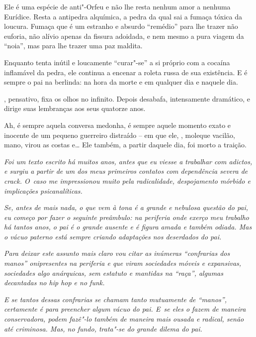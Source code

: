 Ele é uma espécie de anti"-Orfeu e não lhe resta nenhum amor a nenhuma
Eurídice. Resta a antipedra alquímica, a pedra da qual sai a fumaça
tóxica da loucura. Fumaça que é um estranho e absurdo ``remédio'' para
lhe trazer não euforia, não alívio apenas da fissura adoidada, e nem
mesmo a pura viagem da ``noia'', mas para lhe trazer uma paz maldita.

Enquanto  tenta inútil e loucamente ``curar"-se'' a si próprio com a
cocaína inflamável da pedra, ele continua a encenar a roleta russa de
sua existência. E é sempre o pai na berlinda: na hora da morte e em
qualquer dia e naquele dia.

, pensativo, fixa os olhos no infinito. Depois desabafa, intensamente
dramático, e dirige suas lembranças aos seus quatorze anos.

Ah, é sempre aquela conversa medonha, é sempre aquele momento exato e
inocente de um pequeno guerreiro distraído -- em que ele, , moleque
vacilão, mano, virou as costas e… Ele também, a partir daquele
dia, foi morto a traição.

\begin{center}\asterisc{}\end{center}


\emph{Foi um texto escrito há muitos anos, antes que eu viesse a
trabalhar com adictos, e surgiu a partir de um dos meus primeiros
contatos com dependência severa de crack. O~caso me impressionou muito
pela radicalidade, despojamento mórbido e implicações psicanalíticas.}~

\emph{Se, antes de mais nada, o que vem à tona é a grande e nebulosa
questão do pai, eu começo por fazer o seguinte preâmbulo: na periferia
onde exerço meu trabalho há tantos anos, o pai é o grande ausente e é
figura amada e também odiada. Mas o vácuo paterno está sempre criando
adaptações nos deserdados do pai.}~

\emph{Para deixar este assunto mais claro vou citar as inúmeras
``confrarias dos manos'' onipresentes na periferia e que viram
sociedades móveis e expansivas, sociedades algo anárquicas, sem estatuto
e mantidas na ``raça'', algumas decantadas no hip hop e no funk.}~

\emph{E se tantos dessas confrarias se chamam tanto mutuamente de
``manos'', certamente é para preencher algum vácuo do pai. E~se eles o
fazem de maneira conservadora, podem fazê"-lo também de maneira mais
ousada e radical, senão até criminosa. Mas, no fundo, trata"-se do grande
dilema do pai.}~

